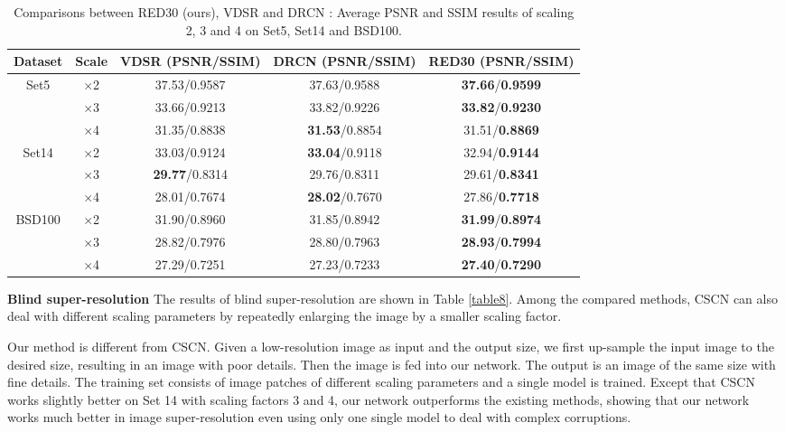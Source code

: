 \begin{table*}[htb!]
\centering
%
\caption{Comparisons between RED30 (ours), VDSR \cite{DBLP:journals/corr/KimLL15b}
and DRCN \cite{DBLP:journals/corr/KimLL15a}: Average PSNR and SSIM results of scaling 2, 3 and 4 on Set5, Set14 and BSD100.}
\begin{tabular}{ c|c|c c c }  \hline
Dataset                 &Scale        &VDSR  (PSNR/SSIM)    &DRCN (PSNR/SSIM)    &RED30 (PSNR/SSIM)  \\ \hline
\multirow{3}{*}{Set5}   &$\times$2    &37.53/0.9587       &37.63/0.9588       &\textbf{37.66}/\textbf{0.9599}      \\
                        &$\times$3    &33.66/0.9213       &33.82/0.9226       &\textbf{33.82}/\textbf{0.9230}      \\
                        &$\times$4    &31.35/0.8838       &\textbf{31.53}/0.8854       &31.51/\textbf{0.8869}      \\ \hline\hline
\multirow{3}{*}{Set14}  &$\times$2    &33.03/0.9124       &\textbf{33.04}/0.9118       &32.94/\textbf{0.9144}      \\
                        &$\times$3    &\textbf{29.77}/0.8314       &29.76/0.8311       &29.61/\textbf{0.8341}      \\
                        &$\times$4    &28.01/0.7674       &\textbf{28.02}/0.7670       &27.86/\textbf{0.7718}      \\ \hline\hline
\multirow{3}{*}{BSD100} &$\times$2    &31.90/0.8960       &31.85/0.8942       &\textbf{31.99}/\textbf{0.8974}      \\
                        &$\times$3    &28.82/0.7976       &28.80/0.7963       &\textbf{28.93}/\textbf{0.7994}      \\
                        &$\times$4    &27.29/0.7251       &27.23/0.7233       &\textbf{27.40}/\textbf{0.7290}      \\ \hline
\end{tabular}
\label{table11}
\end{table*}




{\bf{Blind super-resolution}} The results of blind super-resolution are shown in
Table \ref{table8}. Among the compared methods, CSCN can also deal with different
scaling parameters by repeatedly enlarging the image by a smaller scaling factor.

 Our method is
different from CSCN. Given a low-resolution image as input and the output size,
we first up-sample the input image to the desired size, resulting in an image with
poor details. Then the image is fed into our network. The output is an image of the
same size with fine details. The training set consists of image patches of different
scaling parameters and a single model is trained. Except that CSCN works slightly
better on Set 14 with scaling factors 3 and 4, our network  outperforms the existing methods,
showing that our network works much better in image super-resolution even using only
one single model to deal with complex corruptions.


